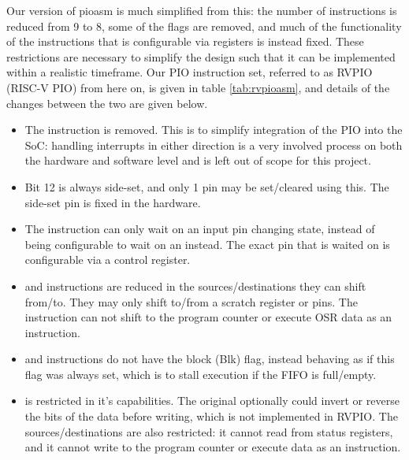 Our version of pioasm is much simplified from this: the number of instructions is reduced from 9 to 8, some of the flags are removed, and much of the functionality of the instructions that is configurable via registers is instead fixed. These restrictions are necessary to simplify the design such that it can be implemented within a realistic timeframe. Our PIO instruction set, referred to as RVPIO (RISC-V PIO) from here on, is given in table \ref{tab:rvpioasm}, and details of the changes between the two are given below.

\begin{itemize}
    \item The  instruction is removed. This is to simplify integration of the PIO into the SoC: handling interrupts in either direction is a very involved process on both the hardware and software level and is left out of scope for this project.
    \item Bit 12 is always side-set, and only 1 pin may be set/cleared using this. The side-set pin is fixed in the hardware.
    \item The  instruction can only wait on an input pin changing state, instead of being configurable to wait on an  instead. The exact pin that is waited on is configurable via a control register.
    \item {} and  instructions are reduced in the sources/destinations they can shift from/to. They may only shift to/from a scratch register or pins. The  instruction can not shift to the program counter or execute OSR data as an instruction.
    \item {} and  instructions do not have the block (Blk) flag, instead behaving as if this flag was always set, which is to stall execution if the FIFO is full/empty.
    \item {} is restricted in it's capabilities. The original optionally could invert or reverse the bits of the data before writing, which is not implemented in RVPIO. The sources/destinations are also restricted: it cannot read from status registers, and it cannot write to the program counter or execute data as an instruction.
\end{itemize}

